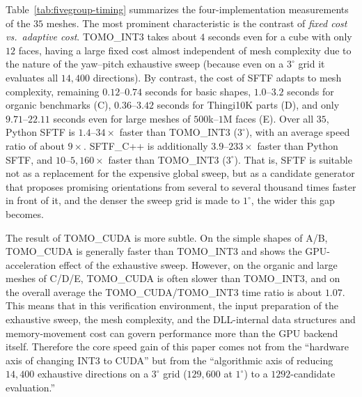 \documentclass[11pt,a4paper]{article}
\begin{document}
Table~\ref{tab:fivegroup-timing} summarizes the four-implementation measurements of the $35$ meshes.
The most prominent characteristic is the contrast of \emph{fixed cost vs.\ adaptive cost}.
TOMO\_INT3 takes about $4$ seconds even for a cube with only $12$ faces,
having a large fixed cost almost independent of mesh complexity due to the nature of the yaw--pitch exhaustive sweep (because even on a $3^\circ$ grid it evaluates all $14{,}400$ directions).
By contrast, the cost of SFTF adapts to mesh complexity,
remaining $0.12$--$0.74$ seconds for basic shapes, $1.0$--$3.2$ seconds for organic benchmarks (C),
$0.36$--$3.42$ seconds for Thingi10K parts (D), and only $9.71$--$22.11$ seconds even for large meshes of $500$k--$1$M faces (E).
Over all $35$, Python SFTF is $1.4$--$34\times$ faster than TOMO\_INT3 ($3^\circ$),
with an average speed ratio of about $9\times$.
SFTF\_C++ is additionally $3.9$--$233\times$ faster than Python SFTF,
and $10$--$5{,}160\times$ faster than TOMO\_INT3 ($3^\circ$).
That is, SFTF is suitable not as a replacement for the expensive global sweep, but
as a candidate generator that proposes promising orientations from several to several thousand times faster in front of it,
and the denser the sweep grid is made to $1^\circ$, the wider this gap becomes.

The result of TOMO\_CUDA is more subtle.
On the simple shapes of A/B, TOMO\_CUDA is generally faster than TOMO\_INT3
and shows the GPU-acceleration effect of the exhaustive sweep.
However, on the organic and large meshes of C/D/E, TOMO\_CUDA is often slower than TOMO\_INT3,
and on the overall average the TOMO\_CUDA/TOMO\_INT3 time ratio is about $1.07$.
This means that in this verification environment, the input preparation of the exhaustive sweep, the mesh complexity,
and the DLL-internal data structures and memory-movement cost can govern performance more than the GPU backend itself.
Therefore the core speed gain of this paper comes not from the ``hardware axis of changing INT3 to CUDA''
but from the ``algorithmic axis of reducing $14{,}400$ exhaustive directions on a $3^\circ$ grid ($129{,}600$ at $1^\circ$) to a $1292$-candidate evaluation.''
\end{document}

